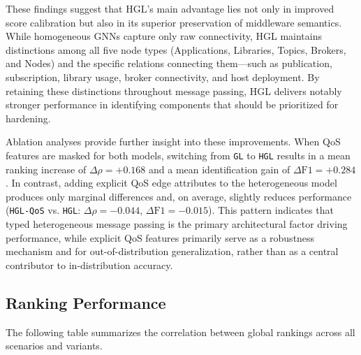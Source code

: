 \documentclass[sigconf,9pt,anonymous]{acmart}
\begin{document}
These findings suggest that HGL’s main advantage lies not only in improved score calibration but also in its superior preservation of middleware semantics. While homogeneous GNNs capture only raw connectivity, HGL maintains distinctions among all five node types (Applications, Libraries, Topics, Brokers, and Nodes) and the specific relations connecting them—such as publication, subscription, library usage, broker connectivity, and host deployment. By retaining these distinctions throughout message passing, HGL delivers notably stronger performance in identifying components that should be prioritized for hardening.

Ablation analyses provide further insight into these improvements. When QoS features are masked for both models, switching from \texttt{GL} to \texttt{HGL} results in a mean ranking increase of $\Delta\rho=+0.168$ and a mean identification gain of $\Delta\text{F1}=+0.284$. In contrast, adding explicit QoS edge attributes to the heterogeneous model produces only marginal differences and, on average, slightly reduces performance (\texttt{HGL-QoS} vs. \texttt{HGL}: $\Delta\rho=-0.044$, $\Delta\text{F1}=-0.015$). This pattern indicates that typed heterogeneous message passing is the primary architectural factor driving performance, while explicit QoS features primarily serve as a robustness mechanism and for out-of-distribution generalization, rather than as a central contributor to in-distribution accuracy.

\subsection{Ranking Performance}

The following table summarizes the correlation between global rankings across all scenarios and variants.
\end{document}
